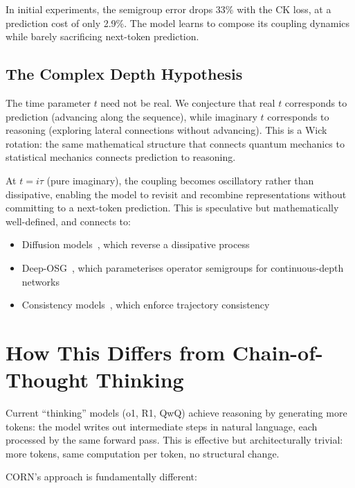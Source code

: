\documentclass[11pt, a4paper]{article}
\theoremstyle{plain}
\theoremstyle{remark}
\begin{document}
In initial experiments, the semigroup error drops 33\% with the CK loss, at a prediction cost of only 2.9\%.
The model learns to compose its coupling dynamics while barely sacrificing next-token prediction.

\subsection{The Complex Depth Hypothesis}

The time parameter $t$ need not be real.
We conjecture that real $t$ corresponds to prediction (advancing along the sequence), while imaginary $t$ corresponds to reasoning (exploring lateral connections without advancing).
This is a Wick rotation: the same mathematical structure that connects quantum mechanics to statistical mechanics connects prediction to reasoning.

At $t = i\tau$ (pure imaginary), the coupling becomes oscillatory rather than dissipative, enabling the model to revisit and recombine representations without committing to a next-token prediction.
This is speculative but mathematically well-defined, and connects to:
\begin{itemize}[nosep]
    \item Diffusion models~\cite{song2023consistency}, which reverse a dissipative process
    \item Deep-OSG~\cite{wu2023deep}, which parameterises operator semigroups for continuous-depth networks
    \item Consistency models~\cite{song2023consistency}, which enforce trajectory consistency
\end{itemize}

\section{How This Differs from Chain-of-Thought Thinking}

Current ``thinking'' models (o1, R1, QwQ) achieve reasoning by generating more tokens: the model writes out intermediate steps in natural language, each processed by the same forward pass.
This is effective but architecturally trivial: more tokens, same computation per token, no structural change.

CORN's approach is fundamentally different:
\end{document}
